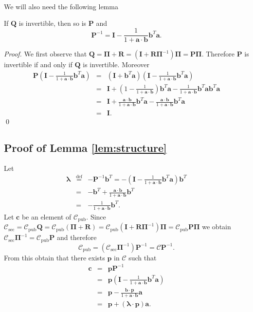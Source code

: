 \documentclass[runningheads,11pt]{llncs}
\newcommand{\eqdef}{\stackrel{\text{def}}{=}}
\newcommand{\code}[1]{\ensuremath{\mathscr{#1}}}
\newcommand{\Csec}{\code{C}_{\text{sec}}}
\newcommand{\Cpub}{\code{C}_{\text{pub}}}
\newcommand{\CC}{\code{C}}
\newcommand{\scp}[2]{#1\cdot #2}
\newcommand{\word}[1]{\ensuremath{\boldsymbol{#1}}}
\newcommand{\av}{\word{a}}
\newcommand{\bv}{\word{b}}
\newcommand{\lambdav}{\word{\lambda}}
\newcommand{\cv}{\word{c}}
\newcommand{\pv}{\word{p}}
\newcommand{\mat}[1]{\ensuremath{\boldsymbol{#1}}}
\renewcommand{\Im}{\mat{I}}
\newcommand{\Pm}{\mat{P}}
\newcommand{\Pim}{\mat{\Pi}}
\newcommand{\Qm}{\mat{Q}}
\newcommand{\Rm}{\mat{R}}
\begin{document}
We will also need the following lemma
\begin{lemma}
\label{lem:inverse}
If $\Qm$ is invertible, then so is $\Pm$ and
$$
\Pm^{-1} = \Im -\frac{1}{1+\scp{\av}{\bv}} \bv^T \av.
$$
\end{lemma}
\begin{proof}
We first observe that 
$\Qm = \Pim + \Rm = (\Im + \Rm \Pim^{-1})\Pim = \Pm \Pim$. Therefore
$\Pm$ is invertible if and only if $\Qm$ is invertible.
Moreover
\begin{eqnarray*}
\Pm \left( \Im -\frac{1}{1+\scp{\av}{\bv}} \bv^T \av \right) &= & \left( \Im + \bv^T \av \right) \left( \Im -\frac{1}{1+\scp{\av}{\bv}} \bv^T \av \right)\\
& = & \Im + \left( 1 - \frac{1}{1+\scp{\av}{\bv} }\right)\bv^T \av  -\frac{1}{1+\scp{\av}{\bv}} \bv^T \av \bv^T \av \\
& = &\Im + \frac{\scp{\av}{\bv}}{1+\scp{\av}{\bv}}\bv^T \av - \frac{\scp{\av}{\bv}}{1+\scp{\av}{\bv}}\bv^T \av\\
& = & \Im.
\end{eqnarray*}
\qed
\end{proof}
 \subsection{Proof of Lemma \ref{lem:structure}}
 
 Let 
 \begin{eqnarray}
 \lambdav &\eqdef &-\Pm^{-1} \bv^T = - \left( \Im -\frac{1}{1+\scp{\av}{\bv}} \bv^T \av \right) \bv^T \nonumber\\
 & = & - \bv^T + \frac{\scp{\av}{\bv}}{1+\scp{\av}{\bv}} \bv^T \nonumber\\
 & = & - \frac{1}{1 + \scp{\av}{\bv}} \bv^T \label{eq:lambdav}.
 \end{eqnarray}
 Let $\cv$ be an element of $\Cpub$.
 Since $\Csec =  \Cpub \Qm =  \Cpub (\Pim + \Rm)= \Cpub (\Im + \Rm\Pim^{-1})\Pim = \Cpub \Pm \Pim$ we obtain
 $\Csec \Pim^{-1}=  \Cpub \Pm$ and therefore
 $$
 \Cpub = (\Csec \Pim^{-1}) \Pm^{-1} = \CC \Pm^{-1}.
 $$
 From this obtain that there exists $\pv$ in $\CC$ such that
 \begin{eqnarray*}
\cv &= & \pv \Pm^{-1}\\
 &=&  \pv \left(  \Im -\frac{1}{1+\scp{\av}{\bv}} \bv^T \av\right)\\
 &=& \pv - \frac{\scp{\bv}{\pv}}{1+\scp{\av}{\bv}} \av\\
 & = &\pv+(\scp{\lambdav}{\pv})\av.
 \end{eqnarray*}
 
\end{document}
